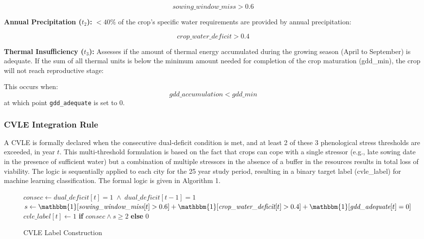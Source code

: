 \documentclass{ieeeaccess}
\begin{document}
\[
sowing\_window\_miss > 0.6
\]

\textbf{Annual Precipitation ($t_2$):} $< 40\%$ of the crop's specific water requirements are provided by annual precipitation:

\[
crop\_water\_deficit > 0.4
\]

\textbf{Thermal Insufficiency ($t_3$):} Assesses if the amount of thermal energy accumulated during the growing season (April to September) is adequate. If the sum of all thermal units is below the minimum amount needed for completion of the crop maturation (gdd\_min), the crop will not reach reproductive stage:

This occurs when:
\[
\mathit{gdd\_accumulation} < \mathit{gdd\_min}
\]
at which point \texttt{gdd\_adequate} is set to 0.

\subsubsection{CVLE Integration Rule}

A CVLE is formally declared when the consecutive dual-deficit condition is met, and at least 2 of these 3 phenological stress thresholds are exceeded, in year $t$. This multi-threshold formulation is based on the fact that crops can cope with a single stressor (e.g., late sowing date in the presence of sufficient water) but a combination of multiple stressors in the absence of a buffer in the resources results in total loss of viability. The logic is sequentially applied to each city for the 25 year study period, resulting in a binary target label (cvle\_label) for machine learning classification. The formal logic is given in Algorithm 1.


\begin{figure}[t]
\begin{minipage}{\textwidth}
\begin{algorithm}[H]
\caption{CVLE Label Construction}
\label{alg:cvle}
\begin{algorithmic}[1]
    \STATE $\textit{consec} \leftarrow \textit{dual\_deficit}[t] = 1 \;\wedge\; \textit{dual\_deficit}[t{-}1] = 1$
    \STATE $s \leftarrow \mathbbm{1}[\textit{sowing\_window\_miss}[t] > 0.6] + \mathbbm{1}[\textit{crop\_water\_deficit}[t] > 0.4] + \mathbbm{1}[\textit{gdd\_adequate}[t] = 0]$
    \STATE $\textit{cvle\_label}[t] \leftarrow 1$ \textbf{if} $\textit{consec} \wedge s \geq 2$ \textbf{else} $0$
  \ENDFOR
\ENDFOR
\end{algorithmic}
\end{algorithm}
\end{minipage}
\end{figure}
\end{document}
